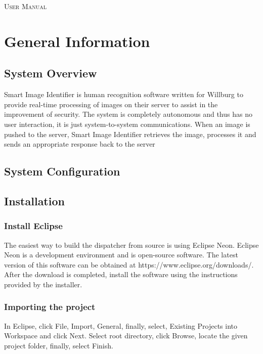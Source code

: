 \documentclass[a4paper,12pt]{report}
\begin{document}
\renewcommand{\thesection}{\arabic{section}}
\newpage
\tableofcontents
\newpage

\begin{center}
\textsc{\LARGE User Manual}\\[1.5cm]
\end{center}

\section{General Information}
\subsection{System Overview}
Smart Image Identifier is human recognition software written for Willburg to provide real-time processing of images on their server to assist in the improvement of security. The system is completely autonomous and thus has no user interaction, it is just system-to-system communications. 
\newline\newline
When an image is pushed to the server, Smart Image Identifier retrieves the image, processes it and sends an appropriate response back to the server

\subsection{System Configuration}

\subsection{Installation}
	\subsubsection{Install Eclipse}
	The easiest way to build the dispatcher from source is using Eclipse Neon. Eclipse Neon is a
	development environment and is open-source software. The latest version of this software can
	be obtained at https://www.eclipse.org/downloads/. After the download is completed, install
	the software using the instructions provided by the installer.
	
	\subsubsection{Importing the project}
	In Eclipse, click File, Import, General, finally, select, Existing Projects into Workspace and click
	Next. \newline\newline
	Select root directory, click Browse, locate the given project folder, finally, select Finish.
	
\end{document}
